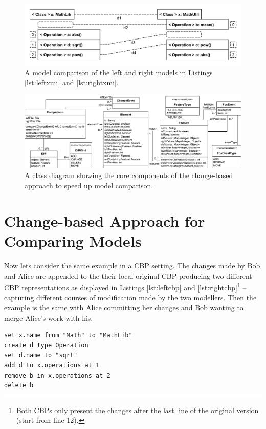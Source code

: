 \begin{figure}
    \includegraphics[width=\linewidth]{XmiComparison}
    \caption{A model comparison of the left and right models in Listings \ref{lst:leftxmi} and \ref{lst:rightxmi}.}
    \label{fig:xmi_comparison}
\end{figure}

\begin{figure}[t]
    \includegraphics[width=\linewidth]{TreeClassDiagram}
    \caption{A class diagram showing the core components of the change-based approach to speed up model comparison.}
    \label{fig:approach_class_diagram}
\end{figure}

\section{Change-based Approach for Comparing Models}
\label{sec:change_based_approach_for_comparing_models}

Now lets consider the same example in a CBP setting.
The changes made by Bob and Alice are appended to the their local original CBP producing two different CBP representations as displayed in Listings \ref{lst:leftcbp} and \ref{lst:rightcbp}\footnote{Both CBPs only present the changes after the last line of the original version (start from line 12).} -- capturing different courses of modification made by the two modellers.
Then the example is the same with Alice committing her changes and Bob wanting to merge Alice's work with his. 

\vspace{-10pt}
\begin{lstlisting}[firstnumber=12,style=eol,caption={The appended changes made by Bob to produce the model in Fig. \ref{fig:left} (left version).},label=lst:leftcbp]
set x.name from "Math" to "MathLib"
create d type Operation
set d.name to "sqrt"
add d to x.operations at 1
remove b in x.operations at 2
delete b
\end{lstlisting}

